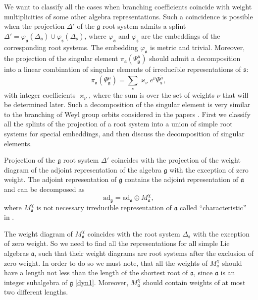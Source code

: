 \documentclass[12pt]{article}
\newcommand{\pia}{\pi_{\mathfrak{a}}}
\newcommand{\gf}{\mathfrak{g}}
\newcommand{\af}{\mathfrak{a}}
\newcommand{\sfr}{\mathfrak{s}}
\begin{document}
We want to classify all the cases when branching coefficients coincide with weight multiplicities of
some other algebra representations. Such a coincidence is possible when the projection $\Delta'$ of
the $\gf$ root system admits a splint $\Delta'=\varphi_{\af}(\Delta_{\af})\cup
\varphi_{\sfr}(\Delta_{\sfr})$, where $\varphi_{\af}$ and $\varphi_{\sfr}$ are the embeddings of
the corresponding root systems. The embedding $\varphi_{\af}$ is metric and trivial. Moreover, the
projection of the singular element $\pia\left(\Psi^{\mu}_{\gf}\right)$ should admit a decomposition into
a linear combination of singular elements of irreducible representations of $\sfr$:
\begin{equation}
  \label{eq:4}
  \pia\left(\Psi^{\mu}_{\gf}\right)=\sum_{\nu} \varkappa_{\nu}e^{\nu}\Psi^{\tilde\mu}_{\sfr},
\end{equation}
with integer coefficients $\varkappa_{\nu}$, where the sum is over the set of weights $\nu$ that
will be determined later. Such a decomposition of the singular element is very similar to the branching of Weyl group orbits considered in the papers \cite{larouche2011branching,larouche2009branching}. First we classify all the splints of the projection of a root system into
a union of simple root systems for special embeddings, and then discuss the decomposition of singular
elements.

Projection of the $\gf$ root system $\Delta'$ coincides with the projection of the weight diagram of the
adjoint representation of the algebra $\gf$ with the exception of zero weight. The adjoint representation of
$\gf$ contains the adjoint representation of $\af$ and can be decomposed as
\begin{equation}
  \label{eq:3}
  \mathrm{ad}_{\gf}=\mathrm{ad}_{\af}\oplus M_{\af}^{\chi},
\end{equation}
where $M^{\chi}_{\af}$ is not necessary irreducible representation of $\af$ called
``characteristic'' in \cite{dynkin1952semisimple}. 

The weight diagram of $M^{\chi}_{\af}$ coincides with the root system $\Delta_{\sfr}$ with the exception of
zero weight. So we need to find all the representations for all simple Lie algebras $\af$, such that
their weight diagrams are root systems after the exclusion of zero weight. In order to do so we must
note, that all the weights of $M^{\chi}_{\af}$ should have a length not less than the length of the shortest
root of $\af$, since $\af$ is an integer subalgebra of $\gf$ \ref{dyn1}. Moreover, $M^{\chi}_{\af}$
should contain weights of at most two different lengths. 
\end{document}
